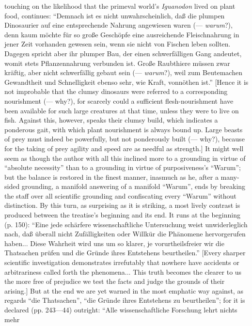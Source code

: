 \documentclass[12pt,a4paper]{book}
\begin{document}
{touching on the likelihood that the primeval world's \textit{Iguanodon} lived on
plant food, continues: ``Demnach ist es nicht unwahrscheinlich, daß die plumpen
Dinosaurier auf eine entsprechende Nahrung angewiesen waren (--- \emph{warum}?),
denn kaum möchte für so große Geschöpfe eine ausreichende Fleischnahrung in
jener Zeit vorhanden gewesen sein, wenn sie nicht von Fischen leben sollten.
Dagegen spricht aber ihr plumper Bau, der einen schwerfälligen Gang andeutet,
womit stets Pflanzennahrung verbunden ist. Große Raubthiere müssen zwar kräftig,
aber nicht schwerfällig gebaut sein (--- \emph{warum}?), weil zum Beutemachen
Gewandtheit und Schnelligkeit ebenso sehr, wie Kraft, vonnöthen ist.'' [Hence it
is not improbable that the clumsy dinosaurs were referred to a corresponding
nourishment (--- why?), for scarcely could a sufficient flesh-nourishment
have been available for such large creatures at that time, unless they were to
live on fish. Against this, however, speaks their clumsy build, which indicates
a ponderous gait, with which plant nourishment is always bound up. Large beasts
of prey must indeed be powerfully, but not ponderously built (--- why?),
because for the taking of prey agility and speed are as needful as strength.] It
might well seem as though the author with all this inclined more to a grounding
in virtue of ``absolute necessity'' than to a grounding in virtue of
purposiveness's ``Warum''; but the balance is restored in the finest manner,
inasmuch as he, after a many-sided grounding, a manifold answering of a manifold
``Warum'', ends by breaking the staff over all scientific grounding and
confiscating every ``Warum'' without distinction. By this turn, as surprising as
it is striking, a most lively contrast is produced between the treatise's
beginning and its end. It runs at the beginning (p. 150): ``Eine jede schärfere
wissenschaftliche Untersuchung weist unwiderleglich nach, daß überall nicht
Zufälligkeiten oder Willkür die Phänomene hervorgerufen haben... Diese Wahrheit
wird uns um so klarer, je vorurtheilsfreier wir die Thatsachen prüfen und die
Gründe ihres Entstehens beurtheilen.'' [Every sharper scientific investigation
demonstrates irrefutably that nowhere have accidents or arbitrariness called
forth the phenomena... This truth becomes the clearer to us the more free of
prejudice we test the facts and judge the grounds of their arising.] But at the
end we are yet warned in the most emphatic way against, as regards ``die
Thatsachen'', ``die Gründe ihres Entstehens zu beurtheilen''; for it is declared
(pp. 243---44) outright: ``Alle wissenschaftliche Forschung lehrt nichts mehr
}
\end{document}
